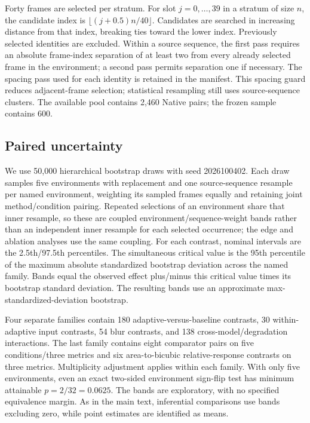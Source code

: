 \documentclass[10pt,twocolumn,letterpaper]{article}
\begin{document}
Forty frames are selected per stratum.
For slot $j=0,\ldots,39$ in a stratum of size $n$, the candidate index is $\lfloor(j+0.5)n/40\rfloor$.
Candidates are searched in increasing distance from that index, breaking ties toward the lower index.
Previously selected identities are excluded.
Within a source sequence, the first pass requires an absolute frame-index separation of at least two from every already selected frame in the environment; a second pass permits separation one if necessary.
The spacing pass used for each identity is retained in the manifest.
This spacing guard reduces adjacent-frame selection; statistical resampling still uses source-sequence clusters.
The available pool contains 2,460 Native pairs; the frozen sample contains 600.

\subsection{Paired uncertainty}
We use 50,000 hierarchical bootstrap draws with seed 2026100402.
Each draw samples five environments with replacement and one source-sequence resample per named environment, weighting its sampled frames equally and retaining joint method/condition pairing.
Repeated selections of an environment share that inner resample, so these are coupled environment/sequence-weight bands rather than an independent inner resample for each selected occurrence; the edge and ablation analyses use the same coupling.
For each contrast, nominal intervals are the 2.5th/97.5th percentiles.
The simultaneous critical value is the 95th percentile of the maximum absolute standardized bootstrap deviation across the named family.
Bands equal the observed effect plus/minus this critical value times its bootstrap standard deviation.
The resulting bands use an approximate max-standardized-deviation bootstrap.

Four separate families contain 180 adaptive-versus-baseline contrasts, 30 within-adaptive input contrasts, 54 blur contrasts, and 138 cross-model/degradation interactions.
The last family contains eight comparator pairs on five conditions/three metrics and six area-to-bicubic relative-response contrasts on three metrics.
Multiplicity adjustment applies within each family.
With only five environments, even an exact two-sided environment sign-flip test has minimum attainable $p=2/32=0.0625$.
The bands are exploratory, with no specified equivalence margin.
As in the main text, inferential comparisons use bands excluding zero, while point estimates are identified as means.
\end{document}
